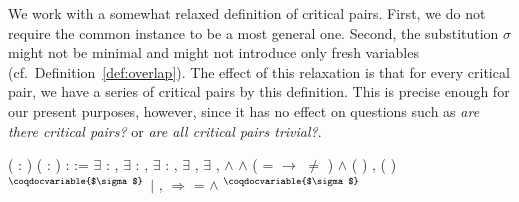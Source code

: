 We work with a somewhat relaxed definition of critical pairs. First,
we do not require the common instance to be a most general
one. Second, the substitution $\sigma$ might not be minimal and might
not introduce only fresh variables
(cf.\ Definition~\ref{def:overlap}). The effect of this relaxation is
that for every critical pair, we have a series of critical pairs by
this \Coq definition. This is precise enough for our present
purposes, however, since it has no effect on questions such as
\emph{are there critical pairs?} or \emph{are all critical pairs
  trivial?}.
\begin{singlespace}
\begin{coqdoccode}
\coqdocnoindent
{}
( : )
(  :
) : 
:=\coqdoceol
\coqdocindent{1.00em}
\ensuremath{\exists}  :
, \ensuremath{\exists}
 :
,
\ensuremath{\exists}  :
,
\ensuremath{\exists} \coqdocvar{$\sigma$},
\ensuremath{\exists} \coqdocvar{$\tau$},\coqdoceol
\coqdocindent{3.00em}
 \coqdocdefinition{$\in$}
\ensuremath{\land}
 \coqdocdefinition{$\in$}
 \ensuremath{\land}
( = 
\ensuremath{\rightarrow}
 \ensuremath{\not=}
)
\ensuremath{\land}\coqdoceol
\coqdocindent{3.00em}
 (
) ,
 (
)$^{\coqdocvariable{$\sigma$}}$ 
\coqdoceol
\coqdocindent{3.00em}
\ensuremath{|}
,
 \ensuremath{\Rightarrow}
  =
\ensuremath{\land}
$^{\coqdocvariable{$\sigma$}}$ 

\end{coqdoccode}
\end{singlespace}
